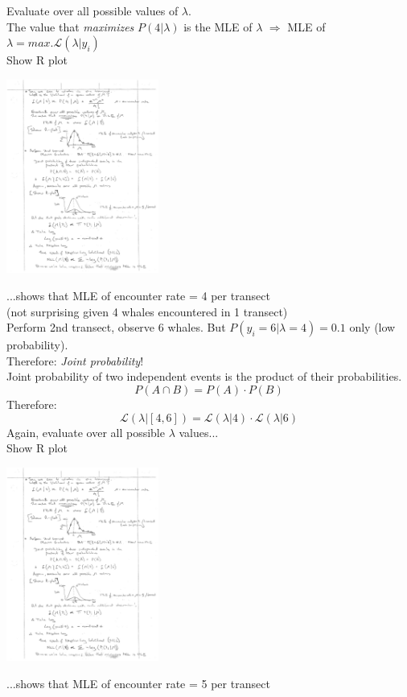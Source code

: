 \documentclass{article}
\newcommand{\note}[1]{\colorbox{gray!30}{#1}}
\newcommand{\ind}{\-\hspace{1cm}}
\begin{document}
Evaluate over all possible values of $\lambda$.\\
The value that \emph{maximizes} $P(4\vert \lambda)$ is the MLE of $\lambda$ $\Rightarrow$  
	MLE of $\lambda = max. \mathcal{L}(\lambda \vert y_i)$\\
\note{Show R plot}
\begin{center}
	\includegraphics[width=5cm]{figs/image5.pdf}
\end{center}
...shows that MLE of encounter rate = 4 per transect\\
\ind (not surprising given 4 whales encountered in 1 transect)\\

Perform 2nd transect, observe 6 whales.  But $P(y_i=6 \vert \lambda=4)=0.1$ only (low probability).\\

Therefore:  \emph{Joint probability}!\\

Joint probability of two independent events is the product of their probabilities.
\begin{equation*}
	P(A \cap B) = P(A) \cdot P(B)
\end{equation*}
Therefore:
\begin{equation*}
	\mathcal{L}(\lambda \vert [4,6]) = \mathcal{L}(\lambda \vert 4) \cdot \mathcal{L}(\lambda \vert 6)
\end{equation*}
Again, evaluate over all possible $\lambda$ values...\\
\note{Show R plot}
\begin{center}
	\includegraphics[width=5cm]{figs/image6.pdf}
\end{center}
...shows that MLE of encounter rate = 5 per transect\\
\end{document}
